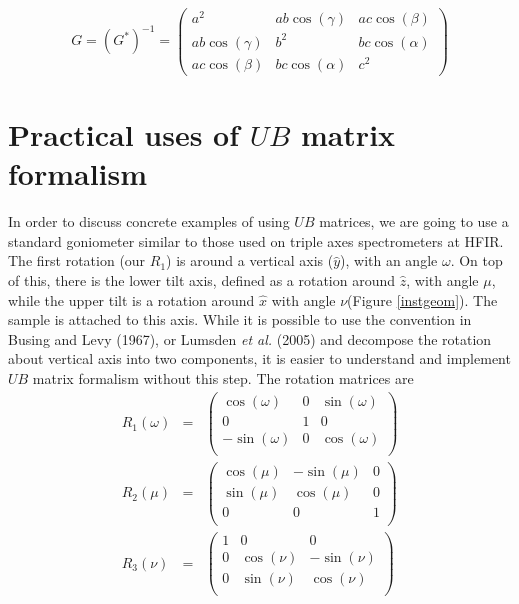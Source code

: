 \documentclass[prb]{revtex4}%
\begin{document}
\begin{equation}\label{mt2}
    G = (G^*)^{-1} = \left(\begin{array}{ccc}
        a^2 & a b \cos(\gamma) & a c \cos(\beta)\\
        a b \cos(\gamma) & b^2 & b c \cos(\alpha) \\
        a c \cos(\beta) & b c \cos(\alpha) &  c^2
    \end{array}\right)
\end{equation}

\section{Practical uses of $UB$ matrix formalism}

In order to discuss concrete examples of using $UB$ matrices, we are going to use a
standard goniometer similar to those used on triple
axes spectrometers at HFIR. The first rotation (our $R_1$) is around a vertical axis ($\widehat{y}$), with an angle $\omega$.
On top of this, there is the lower tilt axis, defined as a rotation around $\widehat{z}$, with angle $\mu$, while the upper
tilt is a rotation around $\widehat{x}$ with angle $\nu$(Figure \ref{instgeom}).
The sample is attached to this axis. While it is possible to
use the convention in Busing and Levy (1967), or Lumsden {\it et al.} (2005) and decompose the rotation about vertical axis
into two components, it is easier to understand and implement $UB$ matrix formalism without this step. The rotation matrices are
\begin{eqnarray}
  R_1(\omega) &=& \left(
                    \begin{array}{ccc}
                      \cos(\omega) & 0 & \sin(\omega) \\
                      0 & 1 & 0 \\
                      -\sin(\omega) & 0 & \cos(\omega) \\
                    \end{array}
                  \right) \label{Rom}
   \\
  R_2(\mu) &=& \left(
                 \begin{array}{ccc}
                   \cos(\mu) & -\sin(\mu) & 0 \\
                   \sin(\mu) & \cos(\mu) & 0 \\
                   0 & 0 & 1 \\
                 \end{array}
               \right) \label{Rmu}
   \\
  R_3(\nu) &=& \left(
                 \begin{array}{ccc}
                    1 & 0 & 0 \\
                   0 & \cos(\nu) & -\sin(\nu)  \\
                   0 & \sin(\nu) & \cos(\nu)  \\
                 \end{array}
               \right)\label{Rnu}
\end{eqnarray}
\end{document}
